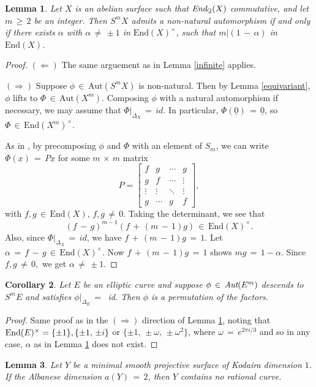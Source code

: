 \documentclass[12pt,reqno]{amsart}
\newtheorem{lemma}{Lemma}[section]
\newtheorem{corollary}[lemma]{Corollary}
\theoremstyle{definition}
\numberwithin{equation}{section}
\begin{document}
\begin{lemma}\label{unit}
Let $X$ is an abelian surface such that $\emph{End}_{\mathbb{Q}} (X)$ commutative, and let $m\,\geq\,2$ be an integer. Then $S^{m}X$ admits a non-natural automorphism if and only if there exists  $\alpha$ with $\alpha\,\neq\, \pm 1$ in $\textrm{End}(X)^{\times}$, such that $m|(1\,-\,\alpha)$ in $\textrm{End}(X)$.  
\end{lemma}
\begin{proof}
$(\Leftarrow)$ The same arguement as in Lemma \ref{infinite} applies.
  
$(\Rightarrow)$ Suppose $\phi\,\in\, \textrm{Aut}(S^{m}X)$ is non-natural. Then by Lemma \ref{equivariant}, $\phi$ lifts to $\Phi\,\in\, \textrm{Aut}(X^{m})$. Composing $\phi$ with a natural automorphism if necessary, we may assume that $\Phi|_{\Delta_X}\,=\,id.$ In particular, $\Phi(\underline{0})\,=\,\underline{0}$, so $\Phi\,\in\, \textrm{End}(X^m)^{\times}$.

As in \cite{Sas}, by precomposing $\phi$ and $\Phi$ with an element of $S_m$, we can write $\Phi(\underline{x})\,=\, P\underline{x}$ for some $m\,\times\,m$ matrix 
\[ P=
\begin{bmatrix}
f & g & \cdots & g \\
g & f & \cdots & \vdots \\
\vdots & \vdots & \ddots & \vdots \\
g & \cdots & g & f
\end{bmatrix},
\]
with $f, g\,\in\, \textrm{End}(X)$, $f, g\,\neq\,0$. Taking the determinant, we see that
$$(f\,-\,g)^{m-1}(f\,+\,(m\,-\,1)g)\,\in\, \textrm{End}(X)^\times.$$
Also, since $\Phi|_{\Delta_X}\,=\,id$, we have $f\,+\,(m\,-\,1)g\,=\,1.$ Let $\alpha\,=\,f\,-\,g\,\in\, \textrm{End}(X)^\times$. Now $f\,+\,(m\,-\,1)g\,=\,1$ shows   $mg\,=\, 1-\alpha.$ 
Since $f,g\,\neq\,0,$ we get $\alpha\,\neq\, \pm 1$.

\end{proof}
\begin{corollary}\label{nounit}
Let $E$ be an elliptic curve and suppose $\phi\,\in\, \emph{Aut}(E^m)$ descends to $S^m E$ and satisfies $\phi|_{\Delta_E}\,=\,$ id. Then $\phi$ is a permutation of the factors.
\end{corollary}
\begin{proof}
Same proof as in the $(\Rightarrow)$ direction of Lemma \ref{unit}, noting that 
$\textrm{End}(E)^\times=\{\pm 1\}, \\
\{\pm 1,\, \pm i\}$ or $\{\pm 1,\, \pm \omega,\, \pm \omega^{2} \}$, where $\omega\,=\, e^{2\pi i/3}$ and so in any case, $\alpha$ as in Lemma \ref{unit} does not exist.
\end{proof}
\begin{lemma}\label{albanese}
Let $Y$ be a minimal smooth projective surface of Kodaira dimension $1$. If the Albanese dimension $a(Y)\,=\,2$, then $Y$ contains no rational curve.    
\end{lemma}
\end{document}
